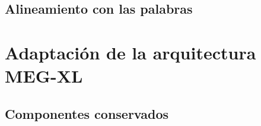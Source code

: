 \subsection{Alineamiento con las palabras}




\section{Adaptación de la arquitectura MEG-XL}

\subsection{Componentes conservados}


